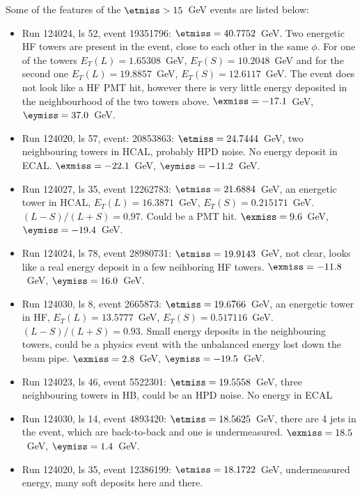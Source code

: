 Some of the features of the $\etmiss>15$~GeV events are listed below:
\begin{itemize}
\item Run 124024, ls 52, event 19351796: $\etmiss=40.7752$~GeV. Two
  energetic HF towers are present in the event, close to each other in
  the same $\phi$. For one of the towers $E_{T}(L)=1.65308$~GeV,
  $E_{T}(S)=10.2048$~GeV and for the second one $E_{T}(L)=19.8857$~GeV,
  $E_{T}(S)=12.6117$~GeV. The event does not look like a HF PMT hit,
  however there is very little energy deposited in the neighbourhood of
  the two towers above. $\exmiss=-17.1$~GeV, $\eymiss=37.0$~GeV.

\item Run 124020, ls 57, event: 20853863: $\etmiss=24.7444$~GeV, two
  neighbouring towers in HCAL, probably
  HPD noise. No energy deposit in ECAL. $\exmiss=-22.1$~GeV, $\eymiss=-11.2$~GeV.

\item Run 124027, ls 35, event 12262783: $\etmiss=21.6884$~GeV, an
  energetic tower in HCAL, $E_{T}(L)=16.3871$~GeV,
  $E_{T}(S)=0.215171$~GeV. $(L-S)/(L+S)=0.97$. Could be a PMT hit. $\exmiss=9.6$~GeV, $\eymiss=-19.4$~GeV.

\item Run 124024, ls 78, event 28980731: $\etmiss=19.9143$~GeV, not clear,
looks like a real energy deposit in a few neihboring HF towers. $\exmiss=-11.8$~GeV, $\eymiss=16.0$~GeV.

\item Run 124030, ls 8, event 2665873: $\etmiss=19.6766$~GeV, an
  energetic tower in HF, $E_{T}(L)= 13.5777$~GeV,
  $E_{T}(S)=0.517116$~GeV. $(L-S)/(L+S)=0.93$. Small energy deposits in
  the neighbouring towers, could be a physics event with the unbalanced
  energy lost down the beam pipe. $\exmiss=2.8$~GeV, $\eymiss=-19.5$~GeV.

\item Run 124023, ls 46, event 5522301: $\etmiss=19.5558 $~GeV, three
  neighbouring towers in HB, could be an HPD noise. No energy in ECAL

\item Run 124030, ls 14, event 4893420: $\etmiss=18.5625$~GeV, there are
  4 jets in the event, which are back-to-back and one is undermeasured. $\exmiss=18.5$~GeV, $\eymiss=1.4$~GeV.

\item Run 124020, ls 35, event 12386199: $\etmiss=18.1722$~GeV,
  undermeasured energy, many soft deposits here and there.


\end{itemize}

